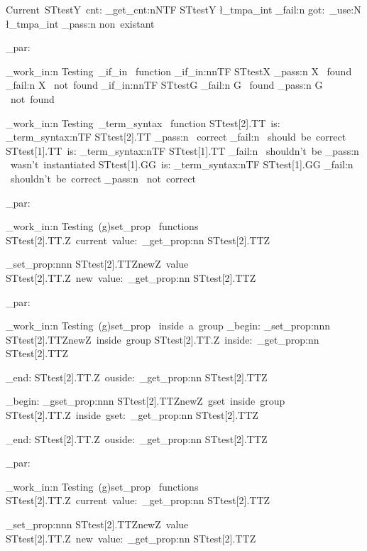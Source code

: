 \documentclass{article}
\begin{document}
Current~STtestY~cnt: 
\starray_get_cnt:nNTF {STtestY} \l_tmpa_int 
  {\sttests_fail:n {got:~\int_use:N \l_tmpa_int}}
  {\sttests_pass:n {non~existant}}

\sttests_par:

\sttests_work_in:n {Testing~_if_in ~function}
\starray_if_in:nnTF {STtest}{X}
  {\sttests_pass:n {X ~found}}
  {\sttests_fail:n {X ~not~found}}
\starray_if_in:nnTF {STtest}{G}
  {\sttests_fail:n {G ~found}}
  {\sttests_pass:n {G ~not~found}}

\sttests_work_in:n {Testing~_term_syntax ~function}
STtest[2].TT~is:
\starray_term_syntax:nTF {STtest[2].TT}
  {\sttests_pass:n {~correct}}
  {\sttests_fail:n {~should~be~correct}}
STtest[1].TT~is:
\starray_term_syntax:nTF {STtest[1].TT}
  {\sttests_fail:n {~shouldn't~be}}
  {\sttests_pass:n {~wasn't~instantiated}}
STtest[1].GG~is:
\starray_term_syntax:nTF {STtest[1].GG}
  {\sttests_fail:n {~shouldn't~be~correct}}
  {\sttests_pass:n {~not~correct}}


\sttests_par:

\sttests_work_in:n {Testing~(g)set_prop ~functions}
STtest[2].TT.Z~current~value:~\starray_get_prop:nn {STtest[2].TT}{Z}\par
\starray_set_prop:nnn {STtest[2].TT}{Z}{newZ~value}
STtest[2].TT.Z~new~value:~\starray_get_prop:nn {STtest[2].TT}{Z}\par

\sttests_par:

\sttests_work_in:n {Testing~(g)set_prop ~inside~a~group}
\group_begin:
  \starray_set_prop:nnn {STtest[2].TT}{Z}{newZ~inside~group}
  STtest[2].TT.Z~inside:~\starray_get_prop:nn {STtest[2].TT}{Z}\par
\group_end:
  STtest[2].TT.Z~ouside:~\starray_get_prop:nn {STtest[2].TT}{Z}\par

\group_begin:
  \starray_gset_prop:nnn {STtest[2].TT}{Z}{newZ~gset~inside~group}
  STtest[2].TT.Z~inside~gset:~\starray_get_prop:nn {STtest[2].TT}{Z}\par
\group_end:
  STtest[2].TT.Z~ouside:~\starray_get_prop:nn {STtest[2].TT}{Z}\par

\sttests_par:

\sttests_work_in:n {Testing~(g)set_prop ~functions}
STtest[2].TT.Z~current~value:~\starray_get_prop:nn {STtest[2].TT}{Z}\par
\starray_set_prop:nnn {STtest[2].TT}{Z}{newZ~value}
STtest[2].TT.Z~new~value:~\starray_get_prop:nn {STtest[2].TT}{Z}\par
\end{document}
